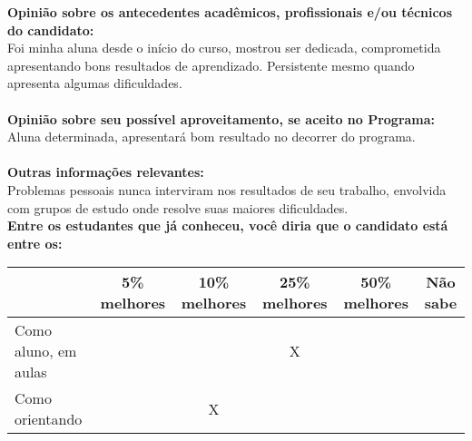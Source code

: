 \documentclass[11pt]{article}
\begin{document}
\textbf{Opinião sobre os antecedentes acadêmicos, profissionais e/ou técnicos do candidato:}
\\Foi minha aluna desde o início do curso, mostrou ser dedicada, comprometida apresentando bons resultados de aprendizado. Persistente mesmo quando apresenta algumas dificuldades.\\
\\
\textbf{Opinião sobre seu possível aproveitamento, se aceito no Programa:}
\\Aluna determinada, apresentará bom resultado no decorrer do programa. \\ 
\\
\textbf{Outras informações relevantes:} \\Problemas pessoais nunca interviram nos resultados de seu trabalho, envolvida com grupos de estudo onde resolve suas maiores dificuldades.
\\[0.3cm]
\textbf{Entre os estudantes que já conheceu, você diria que o candidato está entre os:}
\\
\begin{tabular}{|l|c|c|c|c|c|}
\hline
 & 5\% melhores & 10\% melhores & 25\% melhores & 50\% melhores & Não sabe \\
\hline
Como aluno, em aulas &  &  & X &  & \\
\hline
Como orientando &  & X &  &  & \\
\hline
\end{tabular}
\end{document}
